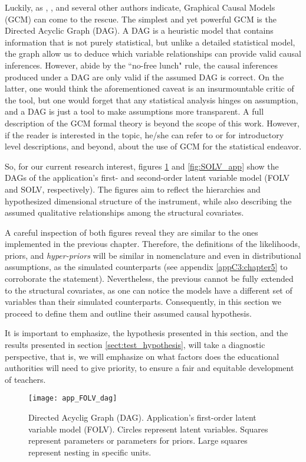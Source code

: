Luckily, as \citet{McElreath_2020}, \citet{Hernan_et_al_2020}, and several other authors indicate, Graphical Causal Models (GCM) can come to the rescue. The simplest and yet powerful GCM is the Directed Acyclic Graph (DAG). A DAG is a heuristic model that contains information that is not purely statistical, but unlike a detailed statistical model, the graph allow us to deduce which variable relationships can provide valid causal inferences. However, abide by the ``no-free lunch" rule, the causal inferences produced under a DAG are only valid if the assumed DAG is correct. On the latter, one would think the aforementioned caveat is an insurmountable critic of the tool, but one would forget that any statistical analysis hinges on assumption, and a DAG is just a tool to make assumptions more transparent. A full description of the GCM formal theory is beyond the scope of this work. However, if the reader is interested in the topic, he/she can refer to \citet{McElreath_2020} or  \citet{Hernan_et_al_2020} for introductory level descriptions, and beyond, about the use of GCM for the statistical endeavor.

So, for our current research interest, figures \ref{fig:FOLV_app} and \ref{fig:SOLV_app} show the DAGs of the application's first- and second-order latent variable model (FOLV and SOLV, respectively). The figures aim to reflect the hierarchies and hypothesized dimensional structure of the instrument, while also describing the assumed qualitative relationships among the structural covariates. 

A careful inspection of both figures reveal they are similar to the ones implemented in the previous chapter. Therefore, the definitions of the likelihoods, priors, and \textit{hyper-priors} will be similar in nomenclature and even in distributional assumptions, as the simulated counterparts (see appendix \ref{appC3:chapter5} to corroborate the statement). Nevertheless, the previous cannot be fully extended to the structural covariates, as one can notice the models have a different set of variables than their simulated counterparts. Consequently, in this section we proceed to define them and outline their assumed causal hypothesis.

It is important to emphasize, the hypothesis presented in this section, and the results presented in section \ref{sect:test_hypothesis}, will take a diagnostic perspective, that is, we will emphasize on what factors does the educational authorities will need to give priority, to ensure a fair and equitable development of teachers.
%
\begin{figure}[H]
	\centering
	\texttt{[image: app\_FOLV\_dag]}
	\caption[Directed Acyclic Graph (DAG). Application's first-order latent variable model (FOLV).]%
	{Directed Acyclig Graph (DAG). Application's first-order latent variable model (FOLV). Circles represent latent variables. Squares represent parameters or parameters for priors. Large squares represent nesting in specific units.}
	\label{fig:FOLV_app}
\end{figure}

